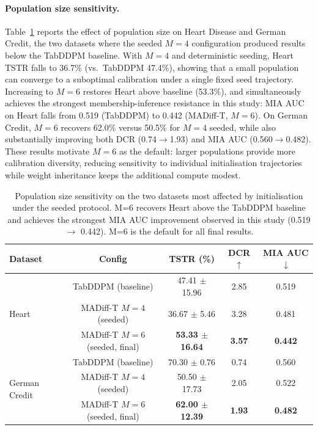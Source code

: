 \documentclass[preprint,12pt]{elsarticle}
\begin{document}
\paragraph{Population size sensitivity.}
Table~\ref{tab:pop_sensitivity} reports the effect of population 
size on Heart Disease and German Credit, the two datasets where 
the seeded $M=4$ configuration produced results below the 
TabDDPM baseline. With $M=4$ and deterministic seeding, Heart 
TSTR falls to 36.7\% (vs.\ TabDDPM 47.4\%), showing that a 
small population can converge to a suboptimal calibration under 
a single fixed seed trajectory. Increasing to $M=6$ restores 
Heart above baseline (53.3\%), and simultaneously achieves 
the strongest membership-inference resistance in this study: 
MIA AUC on Heart falls from 0.519 (TabDDPM) to 0.442 
(MADiff-T, $M=6$). On German Credit, $M=6$ recovers 62.0\% 
versus 50.5\% for $M=4$ seeded, while also substantially 
improving both DCR (0.74$\to$1.93) and MIA AUC 
(0.560$\to$0.482). These results motivate $M=6$ as the 
default: larger populations provide more calibration diversity, 
reducing sensitivity to individual initialisation trajectories 
while weight inheritance keeps the additional compute modest.
\begin{table}[!t]
\centering
\caption{Population size sensitivity on the two datasets most 
affected by initialisation under the seeded protocol. M=6 
recovers Heart above the TabDDPM baseline and achieves 
the strongest MIA AUC improvement observed in this study 
(0.519 $\to$ 0.442). M=6 is the default for all final results.}
\label{tab:pop_sensitivity}
\scriptsize
\setlength{\tabcolsep}{3.5pt}
\renewcommand{\arraystretch}{1.15}
\begin{tabular}{l|c|c|c|c}
\toprule
\rowcolor{gray!20}
\textbf{Dataset} & \textbf{Config} & 
\textbf{TSTR (\%)} & 
\textbf{DCR $\uparrow$} & 
\textbf{MIA AUC $\downarrow$} \\
\midrule
\multirow{3}{*}{Heart}
 & TabDDPM (baseline) 
   & 47.41 $\pm$ 15.96 & 2.85 & 0.519 \\
 & MADiff-T $M=4$ (seeded) 
   & 36.67 $\pm$ 5.46  & 3.28 & 0.481 \\
 & MADiff-T $M=6$ (seeded, final) 
   & \textbf{53.33 $\pm$ 16.64} & \textbf{3.57} & \textbf{0.442} \\
\midrule
\multirow{3}{*}{German Credit}
 & TabDDPM (baseline) 
   & 70.30 $\pm$ 0.76  & 0.74 & 0.560 \\
 & MADiff-T $M=4$ (seeded) 
   & 50.50 $\pm$ 17.73 & 2.05 & 0.522 \\
 & MADiff-T $M=6$ (seeded, final) 
   & \textbf{62.00 $\pm$ 12.39} & \textbf{1.93} & \textbf{0.482} \\
\bottomrule
\end{tabular}
\end{table}
\end{document}
